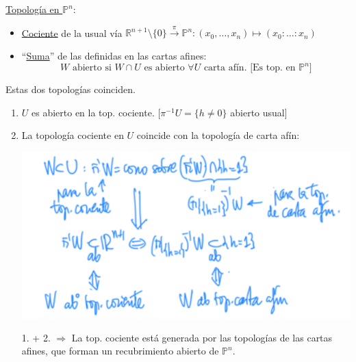 \underline{Topología en }$\mathbb{P}^{n}$: 
\begin{itemize}
    \item \underline{Cociente} de la usual vía $\mathbb{R}^{n+1}\setminus \{0\} \xrightarrow{\pi} \mathbb{P}^{n}: \left( x_0, \ldots, x_n \right) \mapsto \left( x_0 : \ldots : x_n \right)$
    \item ``\underline{Suma}'' de las definidas en las cartas afines:
    \[
        W \text{ abierto si } W \cap U \text{ es abierto } \forall U \text{ carta afín. [Es top. en } \mathbb{P}^{n}] 
    \]
\end{itemize}
Estas dos topologías coinciden.
\begin{demo}
\begin{enumerate}
    \item $U$ es abierto en la top. cociente. [$\pi^{-1} U = \{h \neq 0\}$ abierto usual]
    \item La topología cociente en $U$ coincide con la topología de carta afín:
    \begin{center}
        \includegraphics[scale=0.3]{images/eq_top_proyectivo} 
    \end{center}
    \item[1. + 2.] $\Rightarrow $ La top. cociente está generada por las topologías de las cartas afines, que forman un recubrimiento abierto de $\mathbb{P}^{n}$.
\end{enumerate}
\end{demo}

